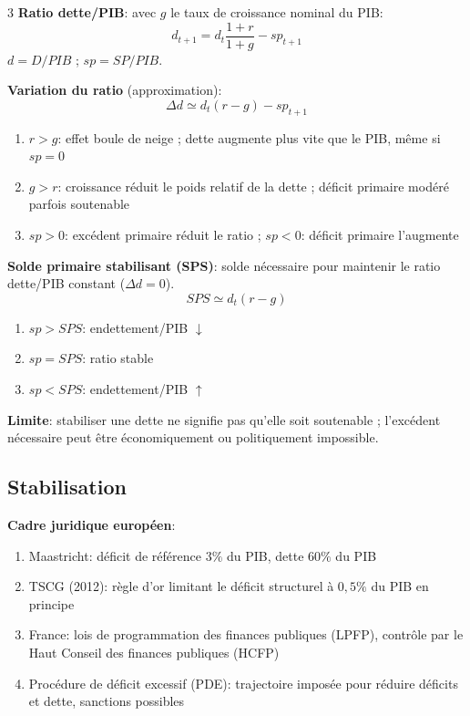 \documentclass[12pt, a4paper]{article}
\begin{document}
\begin{multicols*}{3}
\textbf{Ratio dette/PIB}: avec $g$ le taux de croissance nominal du PIB:
\[
\boxed{d_{t+1}=d_t\frac{1+r}{1+g}-sp_{t+1}}
\]
$d=D/PIB$ ; $sp=SP/PIB$.

\textbf{Variation du ratio} (approximation):
\[
\boxed{\Delta d\simeq d_t(r-g)-sp_{t+1}}
\]
\begin{enumerate}[\roman*.]
  \item $r>g$: effet boule de neige ; dette augmente plus vite que le PIB, même si $sp=0$
  \item $g>r$: croissance réduit le poids relatif de la dette ; déficit primaire modéré parfois soutenable
  \item $sp>0$: excédent primaire réduit le ratio ; $sp<0$: déficit primaire l'augmente
\end{enumerate}

\textbf{Solde primaire stabilisant (SPS)}: solde nécessaire pour maintenir le ratio dette/PIB constant ($\Delta d=0$).
\[
\boxed{SPS\simeq d_t(r-g)}
\]
\begin{enumerate}[\roman*.]
  \item $sp>SPS$: endettement/PIB $\downarrow$
  \item $sp=SPS$: ratio stable
  \item $sp<SPS$: endettement/PIB $\uparrow$
\end{enumerate}

\textbf{Limite}: stabiliser une dette ne signifie pas qu'elle soit soutenable ; l'excédent nécessaire peut être économiquement ou politiquement impossible.

\subsection{Stabilisation}

\textbf{Cadre juridique européen}:
\begin{enumerate}[\roman*.]
  \item Maastricht: déficit de référence $3\%$ du PIB, dette $60\%$ du PIB
  \item TSCG (2012): règle d'or limitant le déficit structurel à $0,5\%$ du PIB en principe
  \item France: lois de programmation des finances publiques (LPFP), contrôle par le Haut Conseil des finances publiques (HCFP)
  \item Procédure de déficit excessif (PDE): trajectoire imposée pour réduire déficits et dette, sanctions possibles
\end{enumerate}


\end{multicols*}
\end{document}
